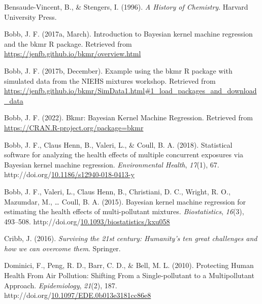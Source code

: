 \documentclass[12pt, twoside]{amherstthesis}
\newenvironment{CSLReferences}[2]%
  {}%
  {\par}
\begin{document}
\begin{CSLReferences}{1}{0}
\leavevmode{}%
Bensaude-Vincent, B., \& Stengers, I. (1996). \emph{A {History} of {Chemistry}}. Harvard University Press.

\leavevmode{}%
Bobb, J. F. (2017a, March). Introduction to {Bayesian} kernel machine regression and the bkmr {R} package. Retrieved from \url{https://jenfb.github.io/bkmr/overview.html}

\leavevmode{}%
Bobb, J. F. (2017b, December). Example using the bkmr {R} package with simulated data from the {NIEHS} mixtures workshop. Retrieved from \url{https://jenfb.github.io/bkmr/SimData1.html\#1_load_packages_and_download_data}

\leavevmode{}%
Bobb, J. F. (2022). Bkmr: {Bayesian} {Kernel} {Machine} {Regression}. Retrieved from \url{https://CRAN.R-project.org/package=bkmr}

\leavevmode{}%
Bobb, J. F., Claus Henn, B., Valeri, L., \& Coull, B. A. (2018). Statistical software for analyzing the health effects of multiple concurrent exposures via {Bayesian} kernel machine regression. \emph{Environmental Health}, \emph{17}(1), 67. http://doi.org/\href{https://doi.org/10.1186/s12940-018-0413-y}{10.1186/s12940-018-0413-y}

\leavevmode{}%
Bobb, J. F., Valeri, L., Claus Henn, B., Christiani, D. C., Wright, R. O., Mazumdar, M., \ldots{} Coull, B. A. (2015). Bayesian kernel machine regression for estimating the health effects of multi-pollutant mixtures. \emph{Biostatistics}, \emph{16}(3), 493--508. http://doi.org/\href{https://doi.org/10.1093/biostatistics/kxu058}{10.1093/biostatistics/kxu058}

\leavevmode{}%
Cribb, J. (2016). \emph{Surviving the 21st century: {Humanity}'s ten great challenges and how we can overcome them}. Springer.

\leavevmode{}%
Dominici, F., Peng, R. D., Barr, C. D., \& Bell, M. L. (2010). Protecting {Human} {Health} {From} {Air} {Pollution}: {Shifting} {From} a {Single}-pollutant to a {Multipollutant} {Approach}. \emph{Epidemiology}, \emph{21}(2), 187. http://doi.org/\href{https://doi.org/10.1097/EDE.0b013e3181cc86e8}{10.1097/EDE.0b013e3181cc86e8}


\end{CSLReferences}
\end{document}
